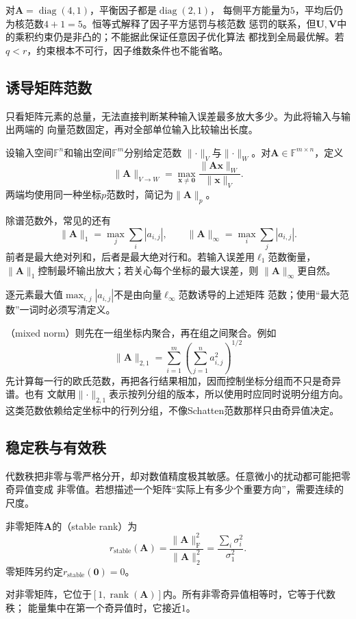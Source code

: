 对$\bm{A}=\operatorname{diag}(4,1)$，平衡因子都是$\operatorname{diag}(2,1)$，
每侧平方能量为$5$，平均后仍为核范数$4+1=5$。恒等式解释了因子平方惩罚与核范数
惩罚的联系，但$\bm{U},\bm{V}$中的乘积约束仍是非凸的；不能据此保证任意因子优化算法
都找到全局最优解。若$q<r$，约束根本不可行，因子维数条件也不能省略。

\subsection{诱导矩阵范数}

只看矩阵元素的总量，无法直接判断某种输入误差最多放大多少。为此将输入与输出两端的
向量范数固定，再对全部单位输入比较输出长度。
\begin{definition}[由向量范数诱导的矩阵范数]
\label{def:matrix-analysis-induced-norm}
设输入空间$\mathbb F^n$和输出空间$\mathbb F^m$分别给定范数
$\lVert\cdot\rVert_V$与$\lVert\cdot\rVert_W$。对$\bm A\in\mathbb F^{m\times n}$，定义
\[
  \lVert\bm{A}\rVert_{V\to W}
  =\max_{\bm{x}\neq\bm{0}}
  \frac{\lVert\bm{A}\bm{x}\rVert_W}{\lVert\bm{x}\rVert_V}.
\]
两端均使用同一种坐标$p$范数时，简记为$\lVert\bm A\rVert_p$。
\end{definition}
除谱范数外，常见的还有
\[
  \lVert\bm{A}\rVert_1=\max_j\sum_i|a_{i,j}|,
  \qquad
  \lVert\bm{A}\rVert_{\infty}=\max_i\sum_j|a_{i,j}|.
\]
前者是最大绝对列和，后者是最大绝对行和。若输入误差用$\ell_1$范数衡量，
$\lVert\bm{A}\rVert_1$控制最坏输出放大；若关心每个坐标的最大误差，则
$\lVert\bm{A}\rVert_{\infty}$更自然。

逐元素最大值$\max_{i,j}|a_{i,j}|$不是由向量$\ell_\infty$范数诱导的上述矩阵
范数；使用“最大范数”一词时必须写清定义。

（mixed norm）则先在一组坐标内聚合，再在组之间聚合。例如
\[
  \lVert\bm{A}\rVert_{2,1}
  =\sum_{i=1}^{m}
    \left(\sum_{j=1}^{n}a_{i,j}^2\right)^{1/2}
\]
先计算每一行的欧氏范数，再把各行结果相加，因而控制坐标分组而不只是奇异谱。也有
文献用$\lVert\cdot\rVert_{2,1}$表示按列分组的版本，所以使用时应同时说明分组方向。
这类范数依赖给定坐标中的行列分组，不像Schatten范数那样只由奇异值决定。

\subsection{稳定秩与有效秩}

代数秩把非零与零严格分开，却对数值精度极其敏感。任意微小的扰动都可能把零奇异值变成
非零值。若想描述一个矩阵“实际上有多少个重要方向”，需要连续的尺度。

\begin{definition}[稳定秩]
\label{def:matrix-analysis-stable-rank}
非零矩阵$\bm A$的（stable rank）为
\begin{equation}
  r_{\mathrm{stable}}(\bm{A})
  =\frac{\lVert\bm{A}\rVert_{\mathrm{F}}^2}
        {\lVert\bm{A}\rVert_2^2}
  =
  \frac{\sum_i\sigma_i^2}{\sigma_1^2}.
  \label{eq:matrix-analysis-stable-rank}
\end{equation}
零矩阵另约定$r_{\mathrm{stable}}(\bm0)=0$。
\end{definition}
对非零矩阵，它位于$[1,\operatorname{rank}(\bm{A})]$内。所有非零奇异值相等时，它等于代数秩；
能量集中在第一个奇异值时，它接近$1$。

